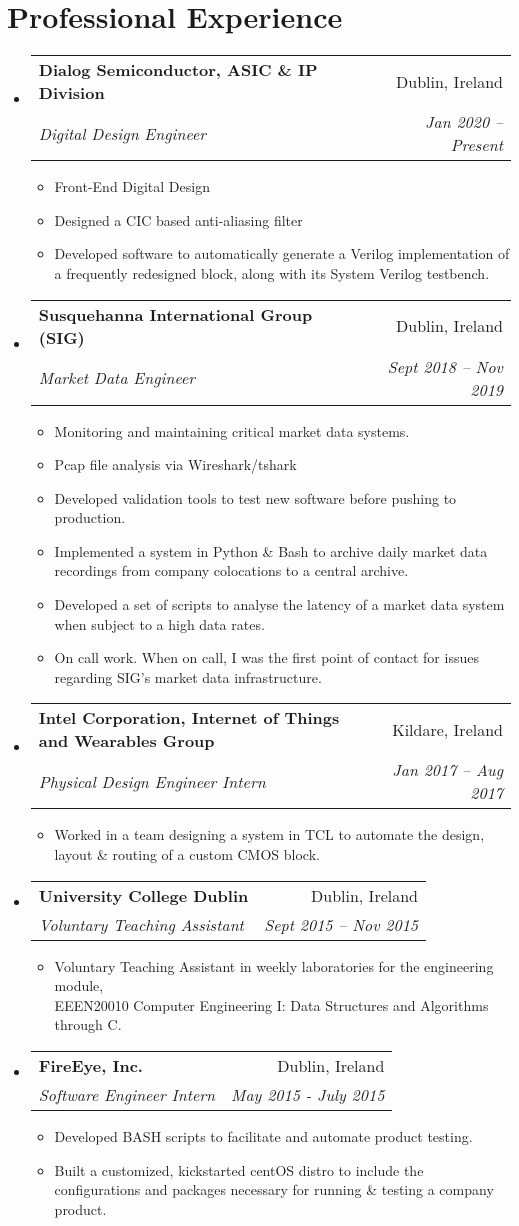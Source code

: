 \documentclass[letterpaper,11pt]{article}
\makeatletter
\newcommand{\resumeGenItem}[1]{
  \item\small{
    {#1 \vspace{-2pt}}
  }
}
\newcommand{\resumeSubheading}[4]{
  \vspace{-1pt}\item
    \begin{tabular*}{0.97\textwidth}{l@{\extracolsep{\fill}}r}
      \textbf{#1} & #2 \\
      \textit{\small#3} & \textit{\small #4} \\
    \end{tabular*}\vspace{-5pt}
}
\newcommand{\resumeSubHeadingListStart}{\begin{itemize}[leftmargin=*]}
\newcommand{\resumeSubHeadingListEnd}{\end{itemize}}
\newcommand{\resumeItemListStart}{\begin{itemize}}
\newcommand{\resumeItemListEnd}{\end{itemize}\vspace{-5pt}}
\makeatother
\begin{document}
\section{Professional Experience}
\medskip
 \resumeSubHeadingListStart
    \resumeSubheading
      {Dialog Semiconductor, ASIC \& IP Division} {Dublin, Ireland}
      {Digital Design Engineer}{Jan 2020 -- Present}
      \resumeItemListStart
         \resumeGenItem{Front-End Digital Design} 
         \resumeGenItem{Designed a CIC based anti-aliasing filter} 
         \resumeGenItem{Developed software to automatically generate a Verilog implementation of a frequently redesigned block, along with its System Verilog testbench.}
      \resumeItemListEnd
      \bigskip
    \resumeSubheading
      {Susquehanna International Group (SIG)} {Dublin, Ireland}
      {Market Data Engineer}{Sept 2018 -- Nov 2019}
      \resumeItemListStart
      \resumeGenItem{Monitoring and maintaining critical market data systems.}
      \resumeGenItem{Pcap file analysis via Wireshark/tshark}
      \resumeGenItem{Developed validation tools to test new software before pushing to production.}
    \resumeGenItem{Implemented a system in Python \& Bash to archive daily market data recordings from company colocations to a central archive.}
     \resumeGenItem{
         Developed a set of scripts to analyse the latency of a  market data system when subject to a high data rates.}
    \resumeGenItem{On call work. When on call, I was the first point of contact for issues regarding SIG's market data infrastructure.}
      \resumeItemListEnd
      \bigskip
     \resumeSubheading
      {Intel Corporation, Internet of Things and Wearables Group} {Kildare, Ireland}
      {Physical Design Engineer Intern}{Jan 2017 -- Aug 2017}
      \resumeItemListStart
         \resumeGenItem{Worked in a team designing a system in TCL to automate the design, layout \& routing of a custom CMOS block.}
      \resumeItemListEnd
      \bigskip
      \resumeSubheading
      {University College Dublin} {Dublin, Ireland}
      {Voluntary Teaching Assistant}{Sept 2015 -- Nov 2015}
      \resumeItemListStart
        \resumeGenItem{Voluntary Teaching Assistant in weekly laboratories for the engineering module,\\ 

EEEN20010	Computer Engineering I: Data Structures and Algorithms through C.}
      \resumeItemListEnd
\bigskip
      \resumeSubheading
      {FireEye, Inc.} {Dublin, Ireland}
      {Software Engineer Intern}{May 2015 - July 2015}
      \resumeItemListStart
        \resumeGenItem{Developed BASH scripts to facilitate and automate product testing.}
         \resumeGenItem{Built a customized, kickstarted centOS distro to include the configurations and packages necessary for running \& testing a company product.}
      \resumeItemListEnd
  \resumeSubHeadingListEnd
\end{document}

